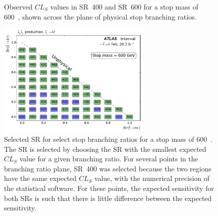 \begin{figure}[ht]
  \centering
  \caption{
    Observed $CL_S$ values in SR~400 and SR~600 for a stop mass of 600~\GeV,
    shown across the plane of physical stop branching ratios.
  }
\end{figure}

\begin{figure}[ht]
  \centering
  \includegraphics[width=0.65\textwidth]
    {figs/blstop/region_selection/region_choice_vs_br_m_600.pdf}
  \caption{
    Selected SR for select stop branching ratios for a stop mass of 600~\GeV.
    The SR is selected by choosing the SR with the smallest expected $CL_S$
    value for a given branching ratio.
    For several points in the branching ratio plane, SR~400 was selected because
    the two regions have the same expected $CL_S$ value, with the numerical
    precision of the statistical software.
    For these points, the expected sensitivity for both SRs is such that
    there is little difference between the expected sensitivity.
  }
\end{figure}


